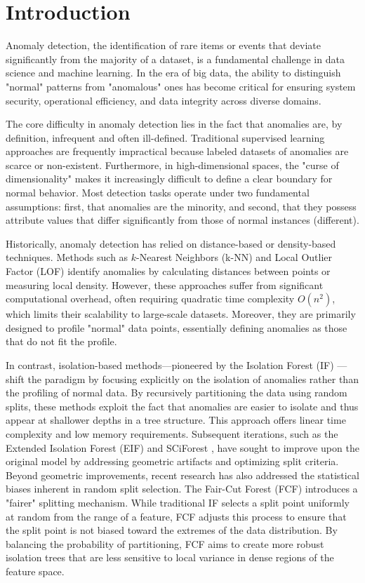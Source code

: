 \section{Introduction}

\noindent Anomaly detection, the identification of rare items or events that deviate significantly from the majority of a dataset, is a fundamental challenge in data science and machine learning. In the era of big data, the ability to distinguish "normal" patterns from "anomalous" ones has become critical for ensuring system security, operational efficiency, and data integrity across diverse domains.

The core difficulty in anomaly detection lies in the fact that anomalies are, by definition, infrequent and often ill-defined. Traditional supervised learning approaches are frequently impractical because labeled datasets of anomalies are scarce or non-existent. Furthermore, in high-dimensional spaces, the "curse of dimensionality" makes it increasingly difficult to define a clear boundary for normal behavior. Most detection tasks operate under two fundamental assumptions: first, that anomalies are the minority, and second, that they possess attribute values that differ significantly from those of normal instances (different).

Historically, anomaly detection has relied on distance-based or density-based techniques. Methods such as $k$-Nearest Neighbors (k-NN) and Local Outlier Factor (LOF) identify anomalies by calculating distances between points or measuring local density. However, these approaches suffer from significant computational overhead, often requiring quadratic time complexity $O(n^2)$, which limits their scalability to large-scale datasets. Moreover, they are primarily designed to profile "normal" data points, essentially defining anomalies as those that do not fit the profile.

In contrast, isolation-based methods—pioneered by the Isolation Forest (IF) \cite{liu2008isolation}—shift the paradigm by focusing explicitly on the isolation of anomalies rather than the profiling of normal data. By recursively partitioning the data using random splits, these methods exploit the fact that anomalies are easier to isolate and thus appear at shallower depths in a tree structure. This approach offers linear time complexity and low memory requirements. Subsequent iterations, such as the Extended Isolation Forest (EIF) \cite{hariri2019extended} and SCiForest \cite{liu2010detecting}, have sought to improve upon the original model by addressing geometric artifacts and optimizing split criteria. Beyond geometric improvements, recent research has also addressed the statistical biases inherent in random split selection. The Fair-Cut Forest (FCF) \cite{cortes2019imputing} introduces a "fairer" splitting mechanism. While traditional IF selects a split point uniformly at random from the range of a feature, FCF adjusts this process to ensure that the split point is not biased toward the extremes of the data distribution. By balancing the probability of partitioning, FCF aims to create more robust isolation trees that are less sensitive to local variance in dense regions of the feature space.

